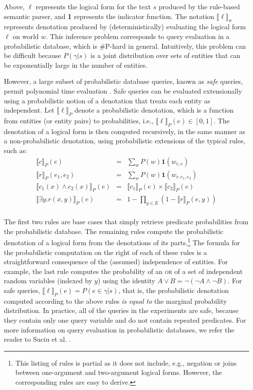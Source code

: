 \documentclass[11pt]{article}
\newcommand{\pred}[1]{\textsc{#1}}
\newcommand{\pden}[1]{\ensuremath{\llbracket #1 \rrbracket_{P}}}
\begin{document}
Above, $\ell$ represents the logical form for the text $s$ produced by
the rule-based semantic parser, and \textbf{1} represents the
indicator function. The notation $\llbracket \ell \rrbracket_w$
represents denotation produced by (deterministically) evaluating the
logical form $\ell$ on world $w$. This inference problem corresponds
to query evaluation in a probabilistic database, which is \#P-hard in
general. Intuitively, this problem can be difficult because $P(\gamma
| s)$ is a joint distribution over sets of entities that can be
exponentially large in the number of entities.

However, a large subset of probabilistic database queries, known as
\emph{safe} queries, permit polynomial time evaluation
\cite{dalvi2007}. Safe queries can be evaluated extensionally using a
probabilistic notion of a denotation that treats each entity as
independent. Let $\pden{ \ell }$ denote a probabilistic denotation,
which is a function from entities (or entity pairs) to probabilities,
i.e., $\pden{ \ell }(e) \in [0, 1]$. The denotation of a
logical form is then computed recursively, in the same manner as a
non-probabilistic denotation, using probabilistic extensions of the
typical rules, such as:
\begin{eqnarray*}
\pden{c}(e) & = & \sum_w P(w) \textbf{1}(w_{c,e}) \\
\pden{r}(e_1, e_2) & = & \sum_w P(w) \textbf{1}(w_{r,e_1,e_2}) \\
\pden{c_1(x) \wedge c_2(x)}(e) & = & \pden{ c_1 }(e) \times \pden{ c_2 }(e) \\
\pden{\exists y.r(x, y)}(e) & = & 1 - \prod_{y \in E} (1 - \pden{r}(e, y)) \\
\end{eqnarray*}

The first two rules are base cases that simply retrieve predicate
probabilities from the probabilistic database. The remaining rules
compute the probabilistic denotation of a logical form from the
denotations of its parts.\footnote{This listing of rules is partial as
  it does not include, e.g., negation or joins between one-argument
  and two-argument logical forms. However, the corresponding rules are
  easy to derive.} The formula for the probabilistic computation on
the right of each of these rules is a straightforward consequence of
the (assumed) independence of entities. For example, the last rule
computes the probability of an \pred{or} of a set of independent
random variables (indexed by $y$) using the identity $A \vee B = \neg
(\neg A \wedge \neg B)$. For safe queries, $\pden{ \ell }(e) = P(e \in
\gamma | s)$, that is, the probabilistic denotation computed according
to the above rules \emph{is equal to} the marginal probability
distribution. In practice, all of the queries in the experiments are
safe, because they contain only one query variable and do not contain
repeated predicates. For more information on query evaluation in
probabilistic databases, we refer the reader to Suciu et
al. .
\end{document}
